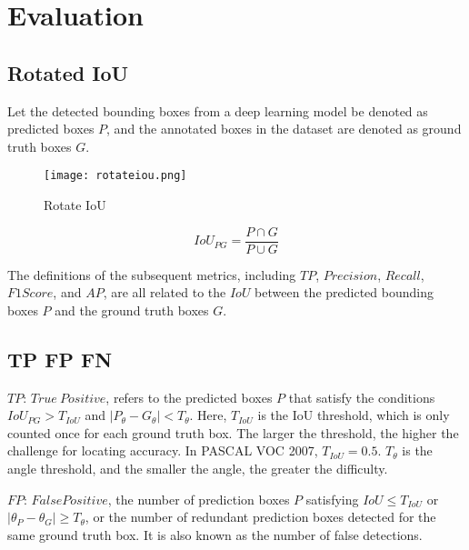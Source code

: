 \documentclass{article}
\begin{document}
\section{Evaluation}

\subsection{Rotated IoU}

Let the detected bounding boxes from a deep learning model be denoted as predicted boxes $P$, and the annotated boxes in the dataset are denoted as ground truth boxes $G$.

\begin{figure}
    \centering
    \texttt{[image: rotateiou.png]}
    \caption{Rotate IoU}
    \label{fig:rotatediou}
\end{figure}

\begin{equation}
	IoU_{PG}=\frac{P \cap G}{P \cup G}
 \label{equa:riou}
\end{equation}



The definitions of the subsequent metrics, including $TP$, $Precision$, $Recall$, $F1Score$, and $AP$, are all related to the $IoU$ between the predicted bounding boxes $P$ and the ground truth boxes $G$.

\subsection{TP FP FN}






$TP$: $True \ Positive$, refers to the predicted boxes $P$ that satisfy the conditions $IoU_{PG}>T_{IoU}$ and $\left|P_{\theta}-G_{\theta}\right|<T_{\theta}$. Here, $T_{IoU}$ is the IoU threshold, which is only counted once for each ground truth box. The larger the threshold, the higher the challenge for locating accuracy. In PASCAL VOC 2007, $T_{IoU}=0.5$. $T_{\theta}$ is the angle threshold, and the smaller the angle, the greater the difficulty.




$FP$: $False Positive$, the number of prediction boxes $P$ satisfying $IoU \leq T_{IoU}$ or $|\theta_P - \theta_G| \geq T_{\theta}$, or the number of redundant prediction boxes detected for the same ground truth box. It is also known as the number of false detections.
\end{document}
